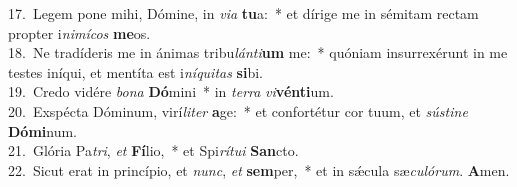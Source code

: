 {17.~}Legem pone mihi, Dómine, in \textit{vi}\textit{a} \textbf{tu}a:~* et dírige me in sémitam rectam propter i\textit{ni}\textit{mí}\textit{cos} \textbf{me}os.\\
{18.~}Ne tradíderis me in ánimas tribu\textit{lán}\textit{ti}\textbf{um} me:~* quóniam insurrexérunt in me testes iníqui, et mentíta est i\textit{ní}\textit{qui}\textit{tas} \textbf{si}bi.\\
{19.~}Credo vidére \textit{bo}\textit{na} \textbf{Dó}mini~* in \textit{ter}\textit{ra} \textit{vi}\textbf{vén}\textbf{ti}um.\\
{20.~}Exspécta Dóminum, virí\textit{li}\textit{ter} \textbf{a}ge:~* et confortétur cor tuum, et \textit{sú}\textit{sti}\textit{ne} \textbf{Dó}\textbf{mi}num.\\
{21.~}Glória Pa\textit{tri}, \textit{et} \textbf{Fí}lio,~* et Spi\textit{rí}\textit{tu}\textit{i} \textbf{San}cto.\\
{22.~}Sicut erat in princípio, et \textit{nunc}, \textit{et} \textbf{sem}per,~* et in sǽcula sæ\textit{cu}\textit{ló}\textit{rum}. \textbf{A}men.\\
